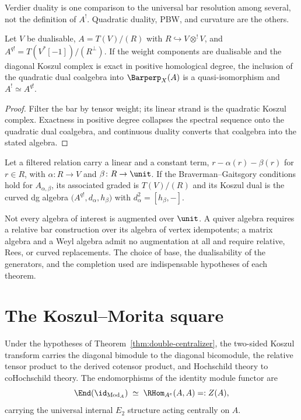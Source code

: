 Verdier duality is one comparison to the universal bar resolution among
several, not the definition of $A^!$. Quadratic duality, PBW, and
curvature are the others.

\begin{theorem}
\label{thm:quadratic}
\StatusProved{} Let $V$ be dualisable, $A=T(V)/(R)$ with $R\hookrightarrow
V\otimes^! V$, and $A^{q!}=T(V^*[-1])/(R^\perp)$. If the weight
components are dualisable and the diagonal Koszul complex is exact in
positive homological degree, the inclusion of the quadratic dual coalgebra
into $\Barperp_X(A)$ is a quasi-isomorphism and $A^!\simeq A^{q!}$.
\end{theorem}

\begin{proof}
Filter the bar by tensor weight; its linear strand is the quadratic
Koszul complex. Exactness in positive degree collapses the spectral
sequence onto the quadratic dual coalgebra, and continuous duality
converts that coalgebra into the stated algebra.
\end{proof}

\begin{theorem}
\label{thm:curved-pbw}
\StatusProved{} Let a filtered relation carry a linear and a constant
term, $r-\alpha(r)-\beta(r)$ for $r\in R$, with $\alpha\colon R\to V$ and
$\beta\colon R\to\unit$. If the Braverman--Gaitsgory conditions
\cite{BG96} hold for $A_{\alpha,\beta}$, its associated graded is
$T(V)/(R)$ and its Koszul dual is the curved dg algebra
$\bigl(A^{q!}, d_\alpha, h_\beta\bigr)$ with $d_\alpha^2=[h_\beta,-]$.
\end{theorem}

\begin{remark}
\label{rem:relative}
Not every algebra of interest is augmented over $\unit$. A quiver algebra
requires a relative bar construction over its algebra of vertex
idempotents; a matrix algebra and a Weyl algebra admit no augmentation at
all and require relative, Rees, or curved replacements. The choice of
base, the dualisability of the generators, and the completion used are
indispensable hypotheses of each theorem.
\end{remark}

\section{The Koszul--Morita square}

\begin{theorem}
\label{thm:koszul-morita}
\StatusConditional{} Under the hypotheses of
Theorem~\ref{thm:double-centralizer}, the two-sided Koszul transform
carries the diagonal bimodule to the diagonal bicomodule, the relative
tensor product to the derived cotensor product, and Hochschild theory to
coHochschild theory. The endomorphisms of the identity module functor are
\[
  \End(\id_{\mathrm{Mod}_A}) \;\simeq\; \RHom_{A^e}(A,A) =: Z(A),
\]
carrying the universal internal $E_2$ structure acting centrally on $A$.
\end{theorem}

